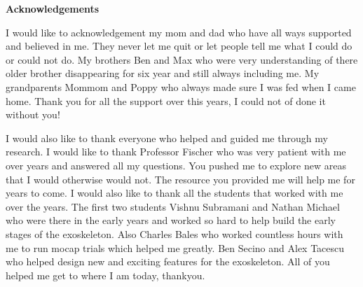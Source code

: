 \begin{center}
	\textbf{Acknowledgements}
	 
\end{center}

I would like to acknowledgement my mom and dad who have all ways supported and believed in me. They never let me quit or let people tell me what I could do or could not do. My brothers Ben and Max who were very understanding of there older brother disappearing for six year and still always including me. My grandparents Mommom and Poppy who always made sure I was fed when I came home. Thank you for all the support over this years, I could not of done it without you!

I would also like to thank everyone who helped and guided me through my research. I would like to thank Professor Fischer who was very patient with me over years and answered all my questions. You pushed me to explore new areas that I would otherwise would not. The resource you provided me will help me for years to come. I would also like to thank all the students that worked with me over the years. The first two students Vishnu Subramani and Nathan Michael who were there in the early years and worked so hard to help build the early stages of the exoskeleton. Also Charles Bales who worked countless hours with me to run mocap trials which helped me greatly. Ben Secino and Alex Tacescu who helped design new and exciting features for the exoskeleton. All of you helped me get to where I am today, thankyou.  

\clearpage